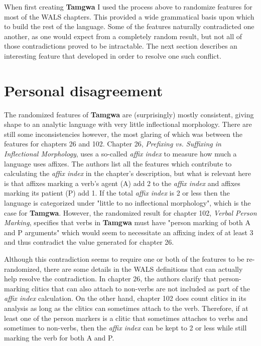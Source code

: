 \documentclass[a4paper,12pt,twoside,openright]{memoir}
\begin{document}
    When first creating \textbf{Tamgwa} I used the process above to randomize features for most of the WALS chapters.  This provided a wide grammatical basis upon which to build the rest of the language.  Some of the features naturally contradicted one another, as one would expect from a completely random result, but not all of those contradictions proved to be intractable.  The next section describes an interesting feature that developed in order to resolve one such conflict.

\section*{Personal disagreement} %

    The randomized features of \textbf{Tamgwa} are (surprisingly) mostly consistent, giving shape to an analytic language with very little inflectional morphology.  There are still some inconsistencies however, the most glaring of which was between the features for chapters 26 and 102.  Chapter 26, \textit{Prefixing vs. Suffixing in Inflectional Morphology}, uses a so-called \textit{affix index} to measure how much a language uses affixes.  The authors list all the features which contribute to calculating the \textit{affix index} in the chapter's description, but what is relevant here is that affixes marking a verb's agent (A) add 2 to the \textit{affix index} and affixes marking its patient (P) add 1.  If the total \textit{affix index} is 2 or less then the language is categorized under "little to no inflectional morphology", which is the case for \textbf{Tamgwa}.  However, the randomized result for chapter 102, \textit{Verbal Person Marking}, specifies that verbs in \textbf{Tamgwa} must have "person marking of both A and P arguments" which would seem to necessitate an affixing index of at least 3 and thus contradict the value generated for chapter 26.

    Although this contradiction seems to require one or both of the features to be re-randomized, there are some details in the WALS definitions that can actually help resolve the contradiction.  In chapter 26, the authors clarify that person-marking clitics that can also attach to non-verbs are not included as part of the \textit{affix index} calculation.  On the other hand, chapter 102 does count clitics in its analysis as long as the clitics can sometimes attach to the verb.  Therefore, if at least one of the person markers is a clitic that sometimes attaches to verbs and sometimes to non-verbs, then the \textit{affix index} can be kept to 2 or less while still marking the verb for both A and P.
\end{document}
